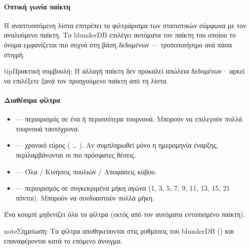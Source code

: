 \documentclass[letterpaper,10pt,greek]{sphinxmanual}
\begin{document}
\paragraph{Οπτική γωνία παίκτη}
\label{\detokenize{manuel:perspective-joueur}}
\sphinxAtStartPar
Η αναπτυσσόμενη λίστα  επιτρέπει το φιλτράρισμα των στατιστικών σύμφωνα με τον αναλυόμενο παίκτη. Το blunderDB επιλέγει αυτόματα τον παίκτη του οποίου το όνομα εμφανίζεται πιο συχνά στη βάση δεδομένων — τροποποιήσιμο ανά πάσα στιγμή.

\begin{sphinxadmonition}{tip}{Πρακτική συμβουλή:}
\sphinxAtStartPar
Η αλλαγή παίκτη δεν προκαλεί απώλεια δεδομένων· αρκεί να επιλέξετε ξανά τον προηγούμενο παίκτη από τη λίστα.
\end{sphinxadmonition}


\paragraph{Διαθέσιμα φίλτρα}
\label{\detokenize{manuel:filtres-disponibles}}\begin{itemize}
\item {} 
\sphinxAtStartPar
{} — περιορισμός σε ένα ή περισσότερα τουρνουά. Μπορούν να επιλεγούν πολλά τουρνουά ταυτόχρονα.

\item {} 
\sphinxAtStartPar
{} — χρονικό εύρος ( … ). Αν συμπληρωθεί μόνο η ημερομηνία έναρξης, περιλαμβάνονται οι πιο πρόσφατες θέσεις.

\item {} 
\sphinxAtStartPar
{} — Όλα / Κινήσεις πουλιών / Αποφάσεις κύβου.

\item {} 
\sphinxAtStartPar
{} — περιορισμός σε συγκεκριμένα μήκη αγώνα (1, 3, 5, 7, 9, 11, 13, 15, 21 πόντοι). Μπορούν να συνδυαστούν πολλά μήκη.

\end{itemize}

\sphinxAtStartPar
Ένα κουμπί  μηδενίζει όλα τα φίλτρα (εκτός από τον αυτόματα εντοπισμένο παίκτη).

\begin{sphinxadmonition}{note}{Σημείωση:}
\sphinxAtStartPar
Τα φίλτρα αποθηκεύονται στις ρυθμίσεις του blunderDB () και επαναφέρονται κατά το επόμενο άνοιγμα.
\end{sphinxadmonition}
\end{document}
